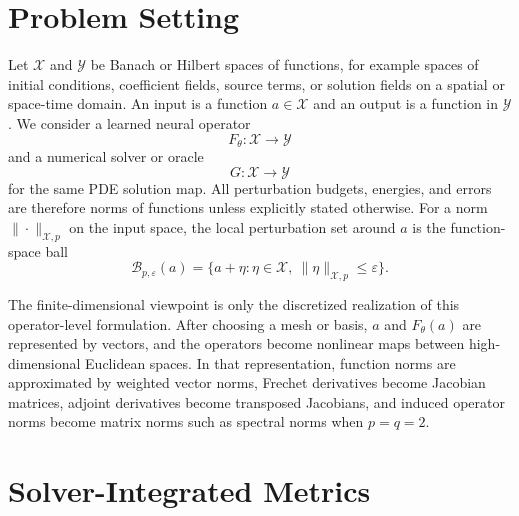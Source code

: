 \documentclass[letterpaper]{article} %
\begin{document}
\section{Problem Setting}

Let $\mathcal{X}$ and $\mathcal{Y}$ be Banach or Hilbert spaces of functions,
for example spaces of initial conditions, coefficient fields, source terms,
or solution fields on a spatial or space-time domain. An input is a function
$a\in\mathcal{X}$ and an output is a function in $\mathcal{Y}$. We consider a
learned neural operator
\begin{equation}
  F_\theta:\mathcal{X}\to\mathcal{Y}
\end{equation}
and a numerical solver or oracle
\begin{equation}
  G:\mathcal{X}\to\mathcal{Y}
\end{equation}
for the same PDE solution map. All perturbation budgets, energies, and
errors are therefore norms of functions unless explicitly stated otherwise.
For a norm $\|\cdot\|_{\mathcal{X},p}$ on the input space, the local
perturbation set around $a$ is the function-space ball
\begin{equation}
  \mathcal{B}_{p,\varepsilon}(a)
  =
  \{a+\eta:\eta\in\mathcal{X},\ \|\eta\|_{\mathcal{X},p}\le\varepsilon\}.
\end{equation}

The finite-dimensional viewpoint is only the discretized realization of this
operator-level formulation. After choosing a mesh or basis, $a$ and
$F_\theta(a)$ are represented by vectors, and the operators become nonlinear
maps between high-dimensional Euclidean spaces. In that representation,
function norms are approximated by weighted vector norms, Frechet derivatives
become Jacobian matrices, adjoint derivatives become transposed Jacobians, and
induced operator norms become matrix norms such as spectral norms when
$p=q=2$.

\section{Solver-Integrated Metrics}
\end{document}
